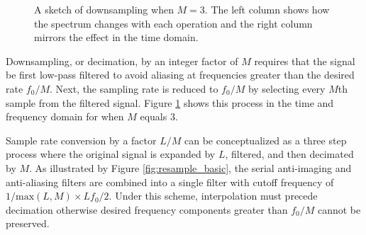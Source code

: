 \begin{figure}[t!]
\caption{A sketch of downsampling when $M = 3$. The left column shows how the spectrum changes with each operation
and the right column mirrors the effect in the time domain.}
\label{fig:downsampling}
\end{figure}

Downsampling, or decimation, by an integer factor of $M$ requires that the signal be first low-pass filtered to 
avoid aliasing at frequencies greater than the desired rate $f_0/M$.  Next, the sampling rate is reduced to 
$f_0/M$ by selecting every $M$th sample from the filtered signal.  Figure \ref{fig:downsampling} shows this 
process in the time and frequency domain for when $M$ equals 3.

Sample rate conversion by a factor $L/M$ can be conceptualized as a three step process where the original signal 
is expanded by $L$, filtered, and then decimated by $M$.  As illustrated by Figure \ref{fig:resample_basic}, 
the serial anti-imaging and 
anti-aliasing filters are combined into a single filter with cutoff frequency of 
$1/\mathrm{max}(L,M) \times Lf_0/2$.  Under this scheme, interpolation must precede decimation otherwise desired 
frequency components greater than $f_0/M$ cannot be preserved.

